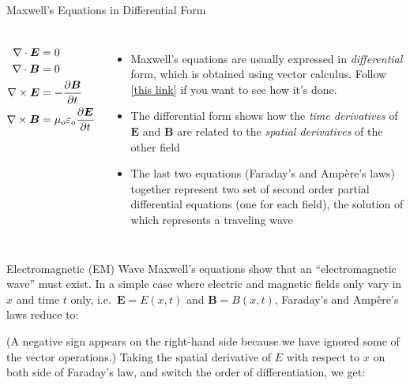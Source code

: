 \documentclass[12pt,aspectratio=169]{beamer}
\newcommand{\eq}[2]{
  \vspace{#1}{\Large\begin{displaymath}#2\end{displaymath}}
}
\begin{document}
\begin{frame}{Maxwell's Equations in Differential Form}
  \begin{columns}

    {\Large
      \begin{align*}
        \nabla\cdot\bm{E} &= 0\\
        \nabla\cdot\bm{B} &= 0\\
        \nabla\times\bm{E} &=-\diffp{\bm{B}}t \\
        \nabla\times\bm{B} &=\mu_o\varepsilon_o\diffp{\bm{E}}t
      \end{align*}
    }

    \begin{itemize}
    \item Maxwell's equations are usually expressed in \emph{differential} form,
      which is obtained using vector calculus. Follow
      [\underline{\href{https://www.wikihow.com/Convert-Maxwell\%27s-Equations-into-Differential-Form}{this link}}] if you want to see how it's done.
    \item The differential form shows how the \emph{time derivatives} of
      $\bm{E}$ and $\bm{B}$ are related to the \emph{spatial derivatives}
      of the other field
    \item The last two equations (Faraday's and Amp\`{e}re's laws) together
      represent two set of second order partial differential equations (one for
      each field), the solution of which represents a traveling wave
    \end{itemize}
  \end{columns}
\end{frame}



\begin{frame}{Electromagnetic (EM) Wave}
  Maxwell's equations show that an ``electromagnetic wave'' must exist. In a
  simple case where electric and magnetic fields only vary in $x$ and time $t$
  only, i.e.\ $\bm{E}=E(x,t)$ and $\bm{B}=B(x,t)$, Faraday's and Amp\`{e}re's
  laws reduce to:

  \eq{-.1in}{
    \diffp Ex=-\diffp Bt \quad\quad
    \diffp Bx=-\mu_0\varepsilon_0\diffp Et
  }

  (A negative sign appears on the right-hand side because we have ignored some
  of the vector operations.) Taking the spatial derivative of $E$ with respect
  to $x$ on both side of Faraday's law, and switch the order of
  differentiation, we get:

  \eq{-.2in}{
    \diffp*{\left(\diffp Ex\right)}x =-\diffp*{\left(\diffp Bt\right)}x
    \quad\rightarrow\quad
    \diffp[2]Ex = -\diffp*{\left(\diffp Bx\right)}t
  }
\end{frame}
\end{document}
